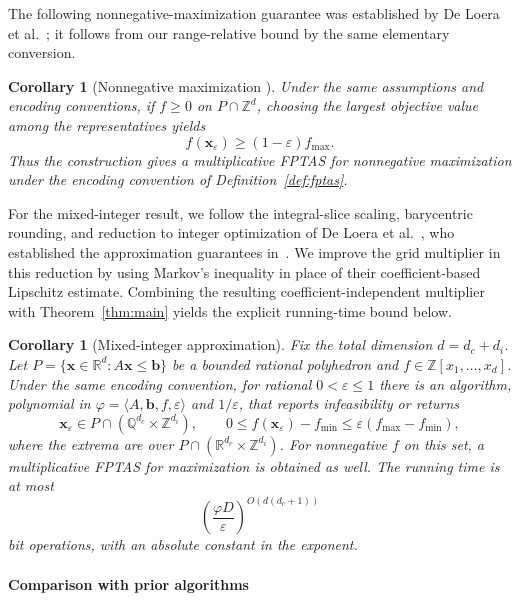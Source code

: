 \documentclass[11pt]{article}
\newtheorem{corollary}[theorem]{Corollary}
\theoremstyle{definition}\newtheorem{definition}{Definition}[section]
\theoremstyle{remark}\newtheorem{remark}[theorem]{Remark}
\newcommand{\R}{\mathbb R}\newcommand{\Q}{\mathbb Q}\newcommand{\Z}{\mathbb Z}
\newcommand{\eps}{\varepsilon}
\begin{document}
The following nonnegative-maximization guarantee was established by De Loera et al.~\cite[Theorem~1.1]{DHKW06}; it follows from our range-relative bound by the same elementary conversion.

\begin{corollary}[Nonnegative maximization {\cite[Theorem~1.1]{DHKW06}}]\label{cor:max}
Under the same assumptions and encoding conventions, if $f\ge0$ on $P\cap\Z^d$, choosing the largest objective value among the representatives yields
\[
 f(\mathbf{x}_{\eps})\ge(1-\eps)f_{\max}.
\]
Thus the construction gives a multiplicative FPTAS for nonnegative maximization under the encoding convention of Definition~\ref{def:fptas}.
\end{corollary}

For the mixed-integer result, we follow the integral-slice scaling, barycentric rounding, and reduction to integer optimization of De Loera et al.~\cite[Section~3]{DHKW08}, who established the approximation guarantees in~\cite[Theorems~1(a) and~2(b)]{DHKW08}. We improve the grid multiplier in this reduction by using Markov's inequality in place of their coefficient-based Lipschitz estimate. Combining the resulting coefficient-independent multiplier with Theorem~\ref{thm:main} yields the explicit running-time bound below.

\begin{corollary}[Mixed-integer approximation]\label{cor:mixed}
Fix the total dimension $d=d_c+d_i$. Let $P=\{\mathbf{x}\in\R^d:A\mathbf{x}\le\mathbf b\}$ be a bounded rational polyhedron and $f\in\Z[x_1,\ldots,x_d]$. Under the same encoding convention, for rational $0<\eps\le1$ there is an algorithm, polynomial in $\varphi=\langle A,\mathbf b,f,\eps\rangle$ and $1/\eps$, that reports infeasibility or returns
\[
 \mathbf{x}_{\eps}\in P\cap(\Q^{d_c}\times\Z^{d_i}),\qquad
 0\le f(\mathbf{x}_{\eps})-f_{\min}\le\eps(f_{\max}-f_{\min}),
\]
where the extrema are over $P\cap(\R^{d_c}\times\Z^{d_i})$. For nonnegative $f$ on this set, a multiplicative FPTAS for maximization is obtained as well. The running time is at most
\begin{equation}\label{eq:mixed-runtime}
 \left(\frac{\varphi D}{\eps}\right)^{O(d(d_c+1))}
\end{equation}
bit operations, with an absolute constant in the exponent.
\end{corollary}

\paragraph{Comparison with prior algorithms}
\end{document}
